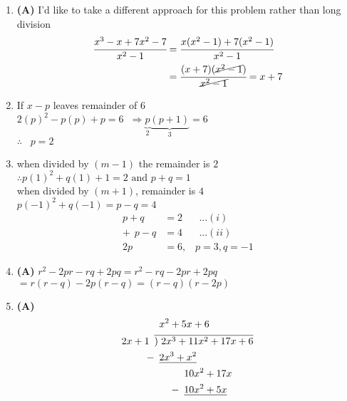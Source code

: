 \begin{multicols}{2}
\begin{enumerate}[label={\textbf{\arabic*.}}]
\item \textbf{(A)} I'd like to take a different approach for this problem rather than long division \\
\begin{align*}
\cfrac{x^3 - x  + 7x^2 - 7}{x^2 - 1} & = \cfrac{x(x^2 -1) + 7(x^2 -1)}{x^2 - 1}  \\
& = \cfrac{(x+7)(\cancel{x^2 - 1})}{\cancel{x^2 -1}} = x+7
\end{align*}
\item If $x-p$ leaves remainder of 6  \\
$2(p)^2 -p(p) + p = 6 \hspace{7pt} \Rightarrow  \underbrace{p}_{2} \underbrace{(p+1)}_{3} = 6$ \\
$\therefore \hspace{10pt} p = 2$
\item when divided by $(m-1)$ the remainder is $2$ \\
$\therefore p(1)^2 + q(1) + 1 = 2 \text{ and } p + q = 1$\\
when divided by $(m+1)$, remainder is $4$ \\
$p(-1)^2 + q(-1) = p -q = 4$
\begin{align*}
p + q &= 2 \hspace{20pt} ...(i) \\
+\hspace{5pt}  p - q &= 4 \hspace{20pt} ...(ii) \\
2p & = 6, \hspace{10pt} p = 3, q = -1
\end{align*}
\item \textbf{(A)}
\(r^2 - 2pr - rq + 2pq = r^2 - rq - 2pr + 2pq \)\\
\(= r(r - q) - 2p(r - q) = (r - q)(r - 2p)\)
\item \textbf{(A)}
\begin{align*}
& \hspace{5pt} x^2 + 5x + 6 \\
2x + 1 \hspace{5pt} & \overline{)\hspace{3pt} 2x^3 + 11x^2 + 17x + 6} \\
- & \hspace{5pt} \underline{2x^3 + x^2} \\
& \hspace{30pt} 10x^2 + 17x \\
- \hspace{-25pt} & \hspace{30pt} \underline{10x^2 + 5x} \\

\end{align*}
\end{enumerate}
\end{multicols}
